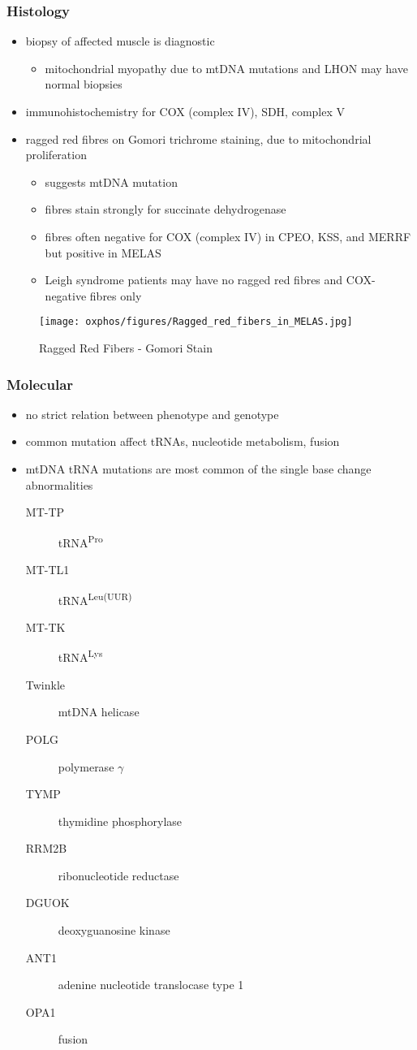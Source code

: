 \documentclass[12pt]{scrartcl}
\begin{document}
\subsubsection{Histology}
\label{sec:org126aa46}
\begin{itemize}
\item biopsy of affected muscle is diagnostic
\begin{itemize}
\item mitochondrial myopathy due to mtDNA mutations and LHON may have normal biopsies
\end{itemize}
\item immunohistochemistry for COX (complex IV), SDH, complex V
\item ragged red fibres on Gomori trichrome staining, due to mitochondrial proliferation
\begin{itemize}
\item suggests mtDNA mutation
\item fibres stain strongly for succinate dehydrogenase
\item fibres often negative for COX (complex IV) in CPEO, KSS, and MERRF
but positive in MELAS
\item Leigh syndrome patients may have no ragged red fibres and
COX-negative fibres only
\end{itemize}
\end{itemize}

\begin{figure}[htbp]
\centering
\texttt{[image: oxphos/figures/Ragged\_red\_fibers\_in\_MELAS.jpg]}
\caption[rrf]{\label{fig:org6cd8406}Ragged Red Fibers - Gomori Stain}
\end{figure}

\subsubsection{Molecular}
\label{sec:org810ce80}
\begin{itemize}
\item no strict relation between phenotype and genotype
\item common mutation affect tRNAs, nucleotide metabolism, fusion
\item mtDNA tRNA mutations are most common of the single base change abnormalities
\begin{description}
\item[{MT-TP}] tRNA\textsuperscript{Pro}
\item[{MT-TL1}] tRNA\textsuperscript{Leu(UUR)}
\item[{MT-TK}] tRNA\textsuperscript{Lys}
\item[{Twinkle}] mtDNA helicase
\item[{POLG}] polymerase \(\gamma\)
\item[{TYMP}] thymidine phosphorylase
\item[{RRM2B}] ribonucleotide reductase
\item[{DGUOK}] deoxyguanosine kinase
\item[{ANT1}] adenine nucleotide translocase type 1
\item[{OPA1}] fusion
\end{description}
\end{itemize}
\end{document}
